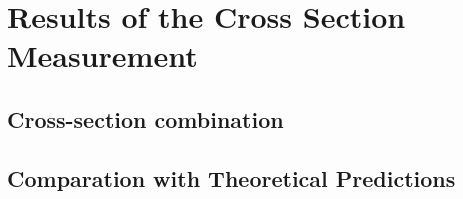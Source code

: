 \chapter{Results of the Cross Section Measurement}

\section{Cross-section combination}

\section{Comparation with Theoretical Predictions}